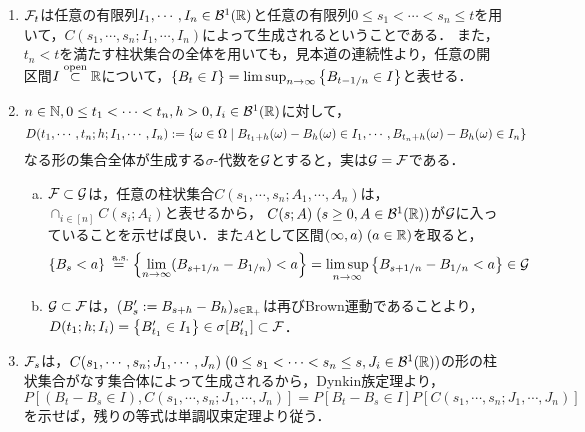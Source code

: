 \documentclass[uplatex,dvipdfmx]{jsreport}
\begin{document}
\begin{Proof}\mbox{}
    \begin{enumerate}
        \item $\mathcal{F}_t$は任意の有限列$I_1,\cdots,I_n\in\mathcal{B}^1(\mathbb{R})$と任意の有限列$0\le s_1<\cdots<s_n\le t$を用いて，$C(s_1,\cdots,s_n;I_1,\cdots,I_n)$によって生成されるということである．
        また，$t_n<t$を満たす柱状集合の全体を用いても，見本道の連続性より，任意の開区間$I\overset{\mathrm{open}}{\subset}\mathbb{R}$について，$\left\{B_t\in I\right\}=\limsup_{n\to\infty}\left\{B_{t-1/n}\in I\right\}$と表せる．
        \item $n\in\mathbb{N},0\le t_1<\cdots<t_n,h>0,I_i\in\mathcal{B}^1(\mathbb{R})$に対して，
        \[D(t_1,\cdots,t_n;h;I_1,\cdots,I_n):=\left\{\omega\in\Omega\mid B_{t_1+h}(\omega)-B_{h}(\omega)\in I_1,\cdots,B_{t_n+h}(\omega)-B_h(\omega)\in I_n\right\}\]
        なる形の集合全体が生成する$\sigma$-代数を$\mathcal{G}$とすると，実は$\mathcal{G}=\mathcal{F}$である．
        \begin{enumerate}[(a)]
            \item $\mathcal{F}\subset\mathcal{G}$は，任意の柱状集合$C(s_1,\cdots,s_n;A_1,\cdots,A_n)$は，$\cap_{i\in[n]}C(s_i;A_i)$と表せるから，
            $C(s;A)\;(s\ge0,A\in\mathcal{B}^1(\mathbb{R}))$が$\mathcal{G}$に入っていることを示せば良い．また$A$として区間$(\infty,a)\;(a\in\mathbb{R})$を取ると，
            \[\left\{B_s<a\right\}\overset{\;\mathrm{a.s.}}{=}\left\{\lim_{n\to\infty}(B_{s+1/n}-B_{1/n})<a\right\}=\limsup_{n\to\infty}\left\{B_{s+1/n}-B_{1/n}<a\right\}\in\mathcal{G}\]
            \item $\mathcal{G}\subset\mathcal{F}$は，$(B'_s:=B_{s+h}-B_h)_{s\in\mathbb{R}_+}$は再びBrown運動であることより，$D(t_1;h;I_i)=\left\{B'_{t_1}\in I_1\right\}\in\sigma[B'_{t_1}]\subset\mathcal{F}$．
        \end{enumerate}
        \item $\mathcal{F}_s$は，$C(s_1,\cdots,s_n;J_1,\cdots,J_n)\;(0\le s_1<\cdots<s_n\le s,J_i\in\mathcal{B}^1(\mathbb{R}))$の形の柱状集合がなす集合体によって生成されるから，Dynkin族定理より，
        \[P[(B_t-B_s\in I),C(s_1,\cdots,s_n;J_1,\cdots,J_n)]=P[B_t-B_s\in I]P[C(s_1,\cdots,s_n;J_1,\cdots,J_n)]\]
        を示せば，残りの等式は単調収束定理より従う．


\end{enumerate}
\end{Proof}
\end{document}

